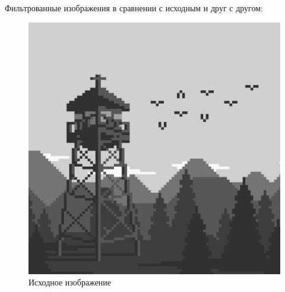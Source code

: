 \documentclass[a4paper]{article}
\begin{document}
Фильтрованные изображения в сравнении с исходным и друг с другом:

\begin{figure}[H]
    \centering
    \includegraphics[width=0.51\linewidth]{2/image.png}
    \caption{Исходное изображение}
\end{figure}\
\end{document}
